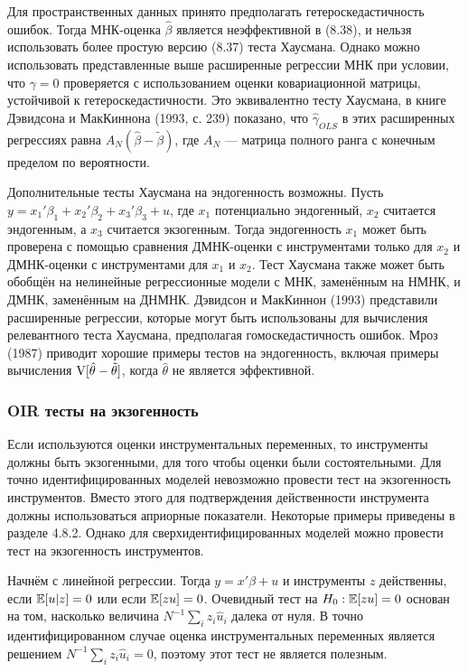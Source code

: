 Для пространственных данных принято предполагать гетероскедастичность ошибок. Тогда МНК-оценка $\hat{\beta}$ является неэффективной в (8.38), и нельзя использовать более простую версию (8.37) теста Хаусмана. Однако можно использовать представленные выше расширенные регрессии МНК при условии, что $\gamma = 0$ проверяется с использованием оценки ковариационной матрицы, устойчивой к гетероскедастичности. Это эквивалентно тесту Хаусмана, в книге Дэвидсона и МакКиннона (1993, с. 239) показано, что $\hat{\gamma}_{OLS}$ в этих расширенных регрессиях равна $A_N(\hat{\beta} - \tilde{\beta})$, где $A_N$ --- матрица полного ранга с конечным пределом по вероятности.

Дополнительные тесты Хаусмана на эндогенность возможны. Пусть $y =  x_1'\beta_1 + x_2'\beta_2 + x_3'\beta_3 + u$, где $x_1$ потенциально эндогенный, $x_2$ считается эндогенным, а $x_3$ считается экзогенным. Тогда эндогенность $x_1$ может быть проверена с помощью сравнения ДМНК-оценки с инструментами только для $x_2$ и ДМНК-оценки с инструментами для $x_1$ и $x_2$. Тест Хаусмана также может быть обобщён на нелинейные регрессионные модели с МНК, заменённым на НМНК, и ДМНК, заменённым на ДНМНК. Дэвидсон и МакКиннон (1993) представили расширенные регрессии, которые могут быть использованы для вычисления релевантного теста Хаусмана, предполагая гомоскедастичность ошибок. Мроз (1987) приводит хорошие примеры тестов на эндогенность, включая примеры вычисления $\mathrm{V}[\hat{\theta} - \tilde{\theta}]$, когда $\hat{\theta}$ не является эффективной.

\subsubsection{OIR тесты на экзогенность}

Если используются оценки инструментальных переменных, то инструменты должны быть экзогенными, для того чтобы оценки были состоятельными. Для точно идентифицированных моделей невозможно провести тест на экзогенность инструментов. Вместо этого для подтверждения действенности инструмента должны использоваться априорные показатели. Некоторые примеры приведены в разделе 4.8.2. Однако для сверхидентифицированных моделей можно провести тест на экзогенность инструментов.

Начнём с линейной регрессии. Тогда $y = x'\beta + u$ и инструменты $z$ действенны, если $\mathbb{E}[u|z] = 0$ или если $\mathbb{E}[zu] = 0$. Очевидный тест на $H_0: \mathbb{E}[zu] = 0$ основан на том, насколько величина $N^{-1}\sum_i z_i\hat{u}_i$ далека от нуля. В точно идентифицированном случае оценка инструментальных переменных является решением $N^{-1}\sum_i z_i\hat{u}_i = 0$, поэтому этот тест не является полезным. 

